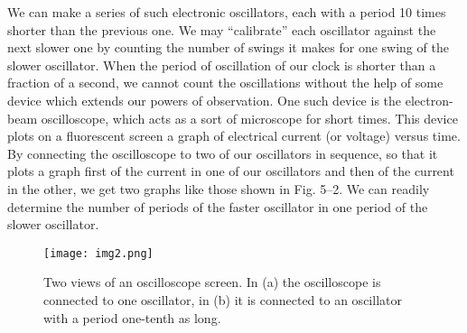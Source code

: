 \documentclass{article}
\begin{document}
	We can make a series of such electronic oscillators, each with a period 10 times shorter than the previous one. We may “calibrate” each oscillator against the next slower one by counting the number of swings it makes for one swing of the slower oscillator. When the period of oscillation of our clock is shorter than a fraction of a second, we cannot count the oscillations without the help of some device which extends our powers of observation. One such device is the electron-beam oscilloscope, which acts as a sort of microscope for short times. This device plots on a fluorescent screen a graph of electrical current (or voltage) versus time. By connecting the oscilloscope to two of our oscillators in sequence, so that it plots a graph first of the current in one of our oscillators and then of the current in the other, we get two graphs like those shown in Fig. 5–2. We can readily determine the number of periods of the faster oscillator in one period of the slower oscillator.\\

	\begin{figure}[h]
	\centering
		\texttt{[image: img2.png]}
		\caption{Two views of an oscilloscope screen. In (a) the oscilloscope is connected to one oscillator, in (b) it is connected to an oscillator with a period one-tenth as long.}
		\label{Fi: Galaxia}
	\end{figure}
\end{document}
